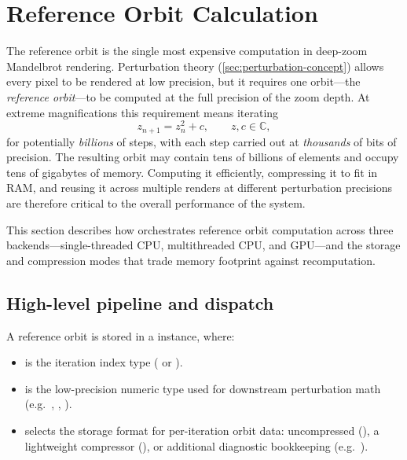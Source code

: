 \section{Reference Orbit Calculation}
\label{sec:ref-orbit-calc}

The reference orbit is the single most expensive computation in
deep-zoom Mandelbrot rendering.  Perturbation theory
(\cref{sec:perturbation-concept}) allows every pixel to be rendered at
low precision, but it requires one orbit---the \emph{reference
orbit}---to be computed at the full precision of the zoom depth.  At
extreme magnifications this requirement means iterating
\begin{equation}
  z_{n+1} = z_n^2 + c,\qquad z,c\in\mathbb{C},
  \label{eq:mandelbrot-recurrence}
\end{equation}
for potentially \emph{billions} of steps, with each step carried out at
\emph{thousands} of bits of precision.  The resulting orbit may contain
tens of billions of elements and occupy tens of gigabytes of memory.
Computing it efficiently, compressing it to fit in RAM, and reusing it
across multiple renders at different perturbation precisions are
therefore critical to the overall performance of the system.

This section describes how  orchestrates reference
orbit computation across three backends---single-threaded CPU,
multithreaded CPU, and GPU---and the storage and compression modes that
trade memory footprint against recomputation.

\subsection{High-level pipeline and dispatch}
\label{subsec:ref-orbit-pipeline}

A reference orbit is stored in a 
instance, where:

\begin{itemize}
  \item {} is the iteration index type ( or ).
  \item {} is the low-precision numeric type used for downstream perturbation math (e.g.\ ,
        , ).
  \item {} selects the storage format for per-iteration orbit data:
        uncompressed (), a lightweight compressor (),
        or additional diagnostic bookkeeping (e.g.\ ).
\end{itemize}

